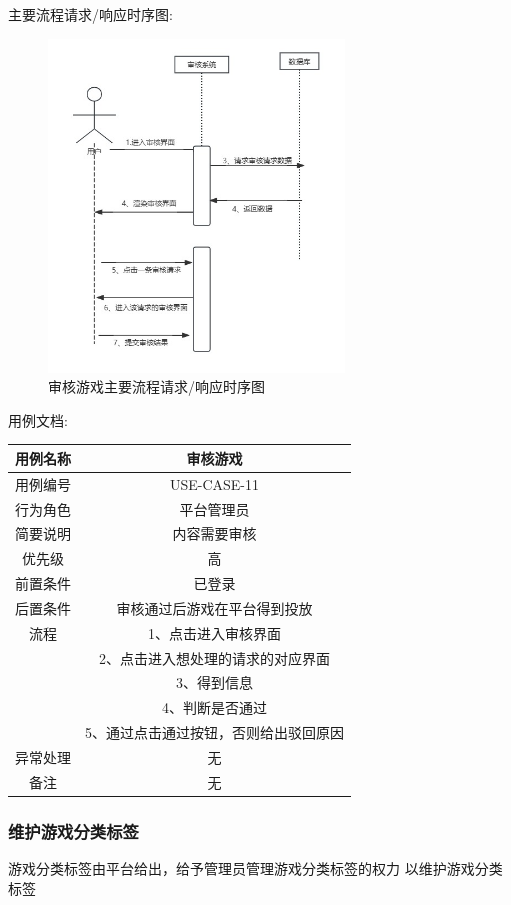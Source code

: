 \documentclass[12pt]{ctexart} %
\begin{document}
主要流程请求/响应时序图:
\begin{figure}[h]
  \centering
  \includegraphics[width=0.7\textwidth]{yongli11.jpg}
  \caption{审核游戏主要流程请求/响应时序图}
\end{figure}
用例文档:

\begin{tabular}{|c|c|}
  \hline
  用例名称& 审核游戏\\
  \hline
  用例编号 & USE-CASE-11\\
  \hline
  行为角色 & 平台管理员\\
  \hline
  简要说明 & 内容需要审核\\
  \hline
  优先级 & 高\\
  \hline
  前置条件 & 已登录\\
  \hline
  后置条件 & 审核通过后游戏在平台得到投放\\
  \hline
  流程 & 1、点击进入审核界面\\
      &  2、点击进入想处理的请求的对应界面\\
      &  3、得到信息\\
      &  4、判断是否通过\\
      &  5、通过点击通过按钮，否则给出驳回原因\\
  \hline
  异常处理 & 无\\
  \hline
  备注 & 无\\
\end{tabular}

\subsubsection{维护游戏分类标签}
游戏分类标签由平台给出，给予管理员管理游戏分类标签的权力
以维护游戏分类标签
\end{document}
